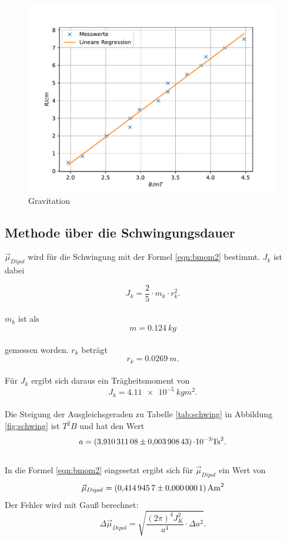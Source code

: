 \newpage

\newpage
\begin{figure}[h!]
    \centering
    \includegraphics[width=\textwidth]{Gravitation.pdf}
    \caption{Gravitation}
    \label{fig:grav}
  \end{figure}

\subsection{Methode über die Schwingungsdauer}
$\vec{\mu}_{Dipol}$ wird für die Schwingung mit der Formel \eqref{eqn:bmom2} bestimmt.
$J_k$ ist dabei

\begin{equation}
  J_k = \frac{2}{5} \cdot m_k \cdot r^2_k.
\label{eqn:tr}
\end{equation}
\\$m_k$ ist als
\begin{equation*}
  m = \SI{0.124}{kg}
\end{equation*}
\\gemessen worden. $r_k$ beträgt
\begin{equation*}
  r_k = \SI{0.0269}{m}.
\end{equation*}
\\Für $J_k$ ergibt sich daraus ein Trägheitsmoment von
\begin{equation*}
  J_k = \SI{4.11e-5}{kg m^2}.
\end{equation*}
\\Die Steigung der Ausgleichsgeraden zu Tabelle \ref{tab:schwing} in Abbildung \ref{fig:schwing} ist ${T^2B} $  und hat den Wert
\begin{equation*}
  a=\SI{3.91031108 \pm 0.00390843} \cdot 10^{-3} \si{T s^2}.
\end{equation*}
\\In die Formel \eqref{eqn:bmom2} eingesetzt ergibt sich für $\vec{\mu}_{Dipol}$ ein Wert von\\
\begin{equation*}
  \vec{\mu}_{Dipol} = \SI{0.4149457 \pm 0.0000001}{A m^2}
\end{equation*}
Der Fehler wird mit Gauß berechnet:
\begin{equation*}
  \Delta \vec{\mu}_{Dipol}= \sqrt{\frac{(2 \pi)^4 J_{K}^2}{a^4} \cdot \Delta a^2}.
\end{equation*}

